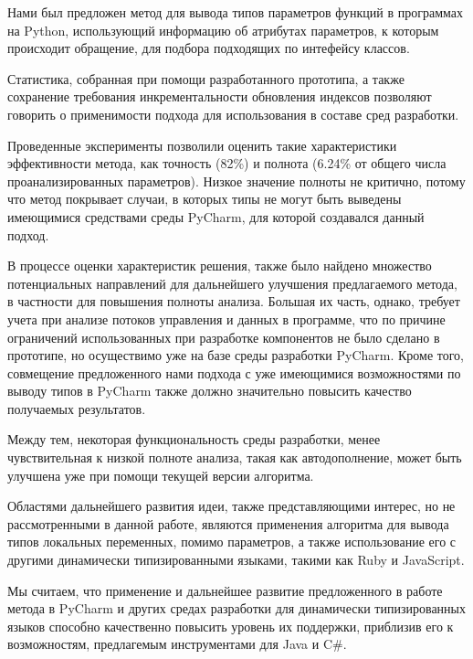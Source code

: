 \conclusion

Нами был предложен метод для вывода типов параметров функций в программах на
Python, использующий информацию об атрибутах параметров, к которым происходит
обращение, для подбора подходящих по интефейсу классов. 

Статистика, собранная при помощи разработанного прототипа, а также сохранение
требования инкрементальности обновления индексов позволяют говорить о
применимости подхода для использования в составе сред разработки. 

Проведенные эксперименты позволили оценить такие характеристики эффективности
метода, как точность (82\%) и полнота (6.24\% от общего числа проанализированных
параметров).  Низкое значение полноты не критично, потому что метод покрывает
случаи, в которых типы не могут быть выведены имеющимися средствами среды
PyCharm, для которой создавался данный подход.

В процессе оценки характеристик решения, также было найдено множество потенциальных
направлений для дальнейшего улучшения предлагаемого метода, в частности для
повышения полноты анализа. Большая их часть, однако, требует учета при анализе
потоков управления и данных в программе, что по причине ограничений использованных
при разработке компонентов не было сделано в прототипе, но осуществимо уже
на базе среды разработки PyCharm. Кроме того, совмещение предложенного нами
подхода с уже имеющимися возможностями по выводу типов в PyCharm также должно
значительно повысить качество получаемых результатов.



Между тем, некоторая функциональность среды разработки, менее чувствительная к
низкой полноте анализа, такая как автодополнение, может быть улучшена уже при
помощи текущей версии алгоритма.

Областями дальнейшего развития идеи, также представляющими интерес, но не
рассмотренными в данной работе, являются применения алгоритма для вывода типов
локальных переменных, помимо параметров, а также использование его с другими динамически
типизированными языками, такими как Ruby и JavaScript.

Мы считаем, что применение и дальнейшее развитие предложенного в работе метода
в PyCharm и других средах разработки для динамически типизированных языков
способно качественно повысить уровень их поддержки, приблизив его к
возможностям, предлагемым инструментами для Java и C\#.





